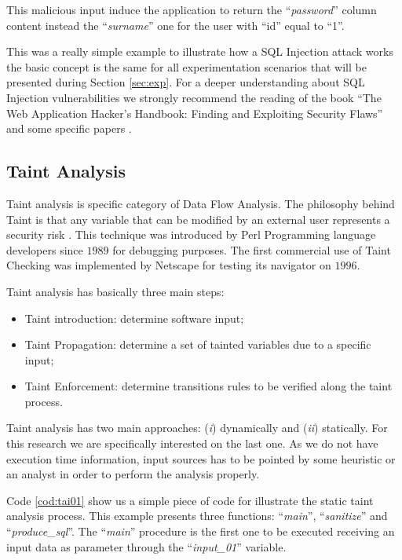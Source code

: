 This malicious input induce the application to return the ``\textit{password}'' column content instead the ``\textit{surname}'' one for the user with ``id'' equal to ``1''.

This was a really simple example to illustrate how a SQL Injection attack works the basic concept is the same for all experimentation scenarios that will be presented during Section \ref{sec:exp}. For a deeper understanding about SQL Injection vulnerabilities we strongly recommend the reading of the book ``The Web Application Hacker's Handbook: Finding and Exploiting Security Flaws'' \cite{Stuttard2011, Clarke2012} and some specific papers \cite{Dougherty2011, Puppy1998}.

\subsection{Taint Analysis}
Taint analysis is specific category of Data Flow Analysis. The philosophy behind Taint is that any variable that can be modified by an external user represents a security risk \cite{Schwartz2010,Tang2010,Zhang2011}. This technique was introduced by Perl Programming language developers since $1989$ \cite{Perl1989} for debugging purposes. The first commercial use of Taint Checking was implemented by Netscape for testing its navigator on $1996$.

Taint analysis has basically three main steps:

\begin{itemize}
	\item Taint introduction: determine software input;
	\item Taint Propagation: determine a set of tainted variables due to a specific input;
	\item Taint Enforcement: determine transitions rules to be verified along the taint process. 
\end{itemize}

Taint analysis has two main approaches: (\textit{i}) dynamically and (\textit{ii}) statically. For this research we are specifically interested on the last one. As we do not have execution time information, input sources has to be pointed by some heuristic or an analyst in order to perform the analysis properly.

Code \ref{cod:tai01} show us a simple piece of code for illustrate the static taint analysis process. This example presents three functions: ``\textit{main}'', ``\textit{sanitize}'' and ``\textit{produce\_sql}''. The ``\textit{main}'' procedure is the first one to be executed receiving an input data as parameter through the ``\textit{input\_01}'' variable.

